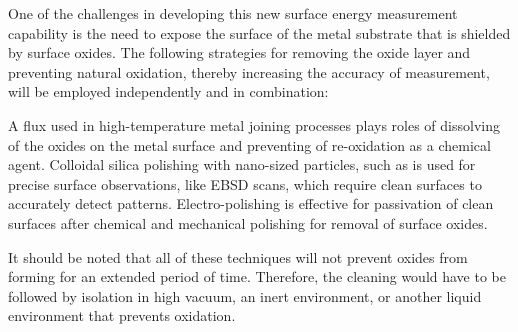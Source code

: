 One of the challenges in developing this new surface energy measurement capability is the need to expose the surface of the metal substrate that is shielded by surface oxides. The following strategies for removing the oxide layer and preventing  natural oxidation, thereby increasing the accuracy of measurement, will be employed independently and in combination:
\begin{outline}
	\1 A flux used in high-temperature metal joining processes plays roles of dissolving of the oxides on the metal surface and preventing of re-oxidation as a chemical agent.
	\1 Colloidal silica polishing with nano-sized particles, such as is used for precise surface observations, like EBSD scans, which require clean surfaces to accurately detect patterns.
	\1 Electro-polishing is effective for passivation of clean surfaces after chemical and mechanical polishing for removal of surface oxides. 
\end{outline}
It should be noted that all of these techniques will not prevent oxides from forming for an extended period of time. Therefore, the cleaning would have to be followed by isolation in high vacuum, an inert environment, or another liquid environment that prevents oxidation.





